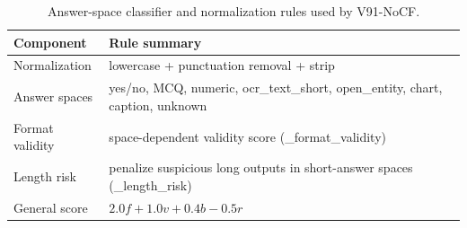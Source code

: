 \begin{table}[t]
\centering
\begin{tabular}{ll}
\toprule
Component & Rule summary \\
\midrule
Normalization & lowercase + punctuation removal + strip \\
Answer spaces & yes/no, MCQ, numeric, ocr\_text\_short, open\_entity, chart, caption, unknown \\
Format validity & space-dependent validity score (\_format\_validity) \\
Length risk & penalize suspicious long outputs in short-answer spaces (\_length\_risk) \\
General score & $2.0f+1.0v+0.4b-0.5r$ \\
\bottomrule
\end{tabular}
\caption{Answer-space classifier and normalization rules used by V91-NoCF.}
\label{tab:answer_space_rules}
\end{table}
